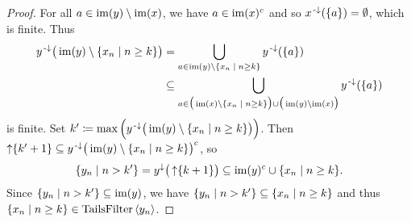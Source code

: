 \begin{proof}
For all $a\in \operatorname{im}(y)\setminus \operatorname{im}(x)$, we have $a\in \operatorname{im}(x)^c$ and so $x^{\text{\hspace{0.15em}-}\downarrow}(\{a\}) = \emptyset$, which is finite. Thus
\begin{align*}
y^\preimf\big(\im(y)\setminus \setbuilder{x_n}{n\geq k}\big) &= \bigcup_{a\in \im(y)\setminus \setbuilder{x_n}{n\geq k}}y^{\preimf}(\{a\}) \\
&\subseteq \bigcup_{a\in \big(\im(x)\setminus \setbuilder{x_n}{n\geq k}\big) \cup \big(\im(y)\setminus \im(x)\big)}y^{\preimf}(\{a\})
\end{align*}
is finite.
Set $k'\defeq \max\Big(y^\preimf\big(\im(y)\setminus \setbuilder{x_n}{n\geq k}\big)\Big)$. Then $\upset \{k'+1\} \subseteq y^\preimf\big(\im(y)\setminus \setbuilder{x_n}{n\geq k}\big)^c$, so
\[ \setbuilder{y_n}{n>k'} = y^\imf\big(\upset\{k+1\}\big) \subseteq \im(y)^c \cup \setbuilder{x_n}{n\geq k}. \]
Since $\setbuilder{y_n}{n>k'} \subseteq \im(y)$, we have $\setbuilder{y_n}{n>k'} \subseteq \setbuilder{x_n}{n\geq k}$ and thus $\setbuilder{x_n}{n\geq k} \in \TailsFilter\seq{y_n}$.
\end{proof}

